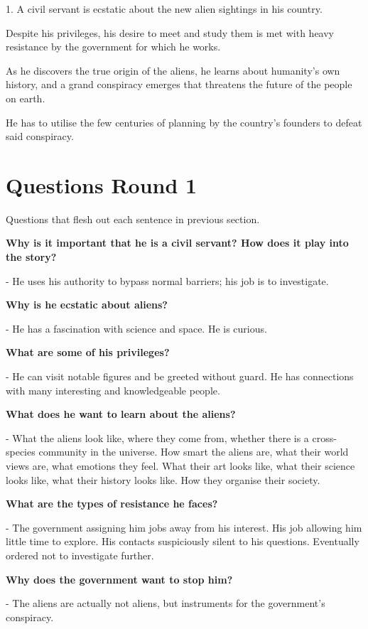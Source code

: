 \documentclass[11pt]{article}
\begin{document}
1. A civil servant is ecstatic about the new alien sightings in his country. 

Despite his privileges, his desire to meet and study them is met with heavy resistance by the government for which he works. 

As he discovers the true origin of the aliens, he learns about humanity's own history, and a grand conspiracy emerges that threatens the future of the people on earth. 

He has to utilise the few centuries of planning by the country's founders to defeat said conspiracy.

\section{Questions Round 1}
Questions that flesh out each sentence in previous section.

\textbf{Why is it important that he is a civil servant? How does it play into the story?}

- He uses his authority to bypass normal barriers; his job is to investigate. 


\textbf{Why is he ecstatic about aliens?}

- He has a fascination with science and space. He is curious.


\textbf{What are some of his privileges?}

- He can visit notable figures and be greeted without guard. 
He has connections with many interesting and knowledgeable people.


\textbf{What does he want to learn about the aliens?}

- What the aliens look like, where they come from, whether there is a cross-species community in the universe. 
How smart the aliens are, what their world views are, what emotions they feel.
What their art looks like, what their science looks like, what their history looks like.
How they organise their society.


\textbf{What are the types of resistance he faces? }

- The government assigning him jobs away from his interest.
His job allowing him little time to explore.
His contacts suspiciously silent to his questions.
Eventually ordered not to investigate further.


\textbf{Why does the government want to stop him?}

- The aliens are actually not aliens, but instruments for the government's conspiracy.
\end{document}
